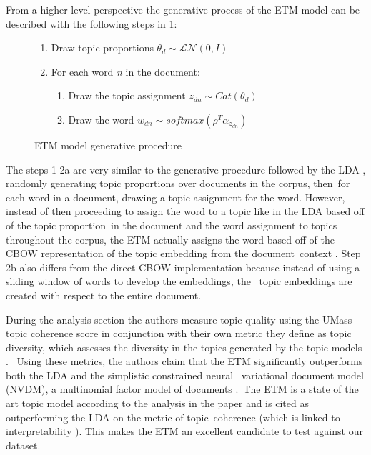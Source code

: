 \documentclass[letterpaper,12pt]{article}
\begin{document}
From a higher level perspective the generative process of the ETM model can be described with the following steps in \ref{eqn:etm-procedure}:
\begin{figure}
	
	\begin{enumerate}
		\item Draw topic proportions $\theta_d \sim \mathcal{L}\mathcal{N}(0,I)$
		\item For each word \emph{n} in the document:
		\begin{enumerate}
			\item Draw the topic assignment $z_{dn} \sim Cat(\theta_d)$
			\item Draw the word $w_{dn} \sim softmax(\rho^T\alpha_{z_{dn}})$
		\end{enumerate}
	\end{enumerate}
	\caption{ETM model generative procedure \cite{dieng2019topic}}
	\label{eqn:etm-procedure}
\end{figure}

The steps 1-2a are very similar to the generative procedure followed by the LDA \cite{blei2003latent}, randomly generating topic proportions over documents in the corpus, then\
for each word in a document, drawing a topic assignment for the word. However, instead of then proceeding to assign the word to a topic like in the LDA based off of the topic proportion\
in the document and the word assignment to topics throughout the corpus, the ETM actually assigns the word based off of the CBOW representation of the topic embedding from the document\
context \cite{dieng2019topic}. Step 2b also differs from the direct CBOW implementation because instead of using a sliding window of words to develop the embeddings, the \
topic embeddings are created with respect to the entire document. 

During the analysis section the authors measure topic quality using the UMass topic coherence score \cite{mimno2011optimizing} in conjunction with their own
metric they define as topic diversity, which assesses the diversity in the topics generated by the topic models \cite{dieng2019topic}. \
Using these metrics, the authors claim that the ETM significantly outperforms both the LDA and the simplistic constrained neural \
variational document model (NVDM), a multinomial factor model of documents \cite{miao2016neural}.\
The ETM is a state of the art topic model according to the analysis in the paper and is cited as outperforming the LDA on the metric of topic\
coherence (which is linked to interpretability \cite{mimno2011optimizing}). This makes the ETM an excellent candidate to test against our dataset.
\end{document}
